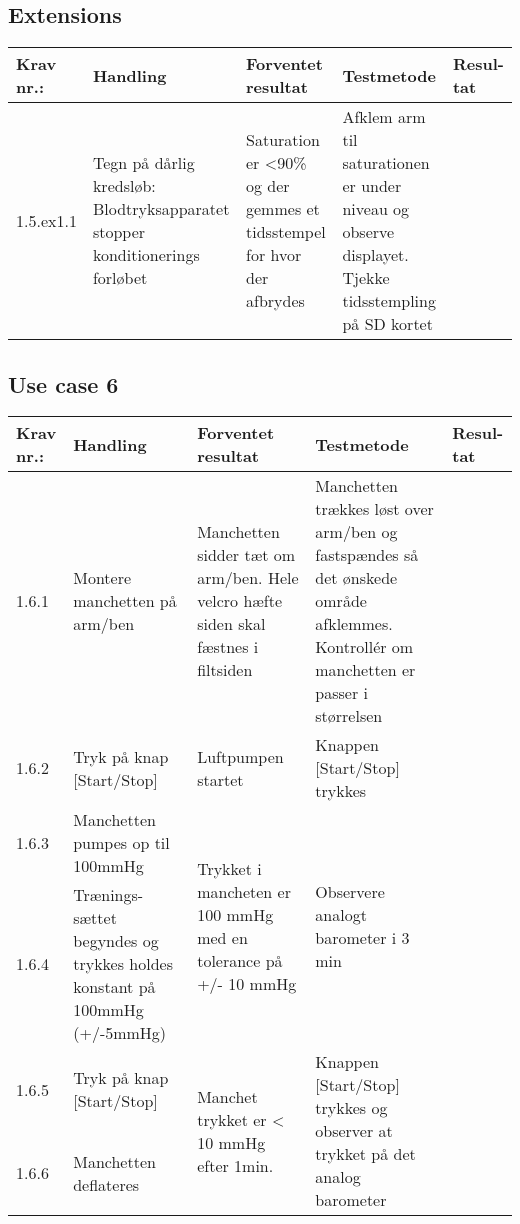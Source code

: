 \documentclass[11pt]{article}
\begin{document}
					\subsection*{Extensions}
					\begin{center}
						\begin{longtable}{|p{1.5cm}|p{2cm}|p{3cm}|p{3cm}|p{1.1cm}|}
							\hline
							Krav nr.: & Handling & Forventet resultat & Testmetode & Resul-tat  \\\hline
							1.5.ex1.1 & Tegn på dårlig kredsløb: Blodtryksapparatet stopper konditionerings forløbet & Saturation er \textless90\% og der gemmes et tidsstempel for hvor der afbrydes & Afklem arm til saturationen er  under niveau og observe displayet.
							Tjekke tidsstempling på SD kortet & \\ \hline
						\end{longtable}
				\end{center}
				
						\subsection{Use case 6}
						\begin{center}
							\begin{longtable}{|p{1.5cm}|p{2cm}|p{3cm}|p{3cm}|p{1.1cm}|}
								\hline
								Krav nr.: & Handling & Forventet resultat & Testmetode & Resul-tat  \\\hline
								1.6.1 & Montere manchetten på arm/ben & Manchetten sidder tæt om arm/ben. Hele velcro hæfte siden skal fæstnes i filtsiden & Manchetten trækkes løst over arm/ben og fastspændes så det ønskede område afklemmes. Kontrollér om manchetten er passer i størrelsen & \\ \hline
								1.6.2 & Tryk på knap [Start/Stop] & Luftpumpen startet & Knappen [Start/Stop] trykkes & \\ \hline
								1.6.3 & Manchetten pumpes op til 100mmHg & \multirow{2}{3cm}{Trykket i mancheten er 100 mmHg med en tolerance på +/- 10 mmHg}& \multirow{2}{3cm}{Observere analogt barometer i 3 min}& \multirow{2}{3cm}{} \\ \cline{1-2}
								1.6.4 & Trænings-sættet begyndes og trykkes holdes konstant på 100mmHg (+/-5mmHg) & & & \\ \hline
								1.6.5 & Tryk på knap [Start/Stop]  & \multirow{2}{3cm}{Manchet trykket er < 10 mmHg efter 1min.} & \multirow{2}{3cm}{Knappen [Start/Stop] trykkes og observer at trykket på det analog barometer} & \multirow{2}{3cm}{} \\ [2cm] \cline{1-2}
								1.6.6 & Manchetten deflateres  & & & \\ \hline
							\end{longtable}
						\end{center}
						
\end{document}
